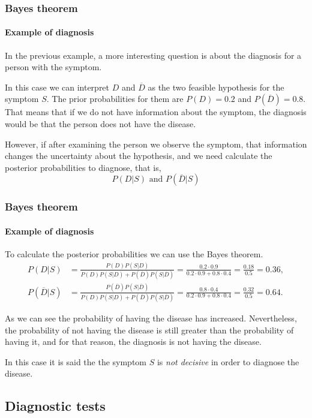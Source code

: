 \begin{frame}
\frametitle{Bayes theorem}
\framesubtitle{Example of diagnosis}
In the previous example, a more interesting question is about the diagnosis for a person with the symptom.  

In this case we can interpret $D$ and $\overline{D}$ as the two feasible hypothesis for the symptom $S$.
The prior probabilities for them are $P(D)=0.2$ and $P(\overline{D})=0.8$.
That means that if we do not have information about the symptom, the diagnosis would be that the person does not have the disease.

However, if after examining the person we observe the symptom, that information changes the uncertainty about the hypothesis, and we need calculate the posterior probabilities to diagnose, that is,
\[
P(D|S) \mbox{ and } P(\overline{D}|S)
\]
\end{frame}


\begin{frame}
\frametitle{Bayes theorem}
\framesubtitle{Example of diagnosis}
To calculate the posterior probabilities we can use the Bayes theorem.
\begin{align*}
P(D|S) &= \frac{P(D)P(S|D)}{P(D)P(S|D)+P(\overline{D})P(S|\overline{D})} = \frac{0.2\cdot 0.9}{0.2\cdot 0.9 + 0.8\cdot 0.4} = \frac{0.18}{0.5}=0.36,\\
P(\overline{D}|S) &= \frac{P(\overline{D})P(S|\overline{D})}{P(D)P(S|D)+P(\overline{D})P(S|\overline{D})} = \frac{0.8\cdot 0.4}{0.2\cdot 0.9 + 0.8\cdot 0.4} = \frac{0.32}{0.5}=0.64.
\end{align*}

As we can see the probability of having the disease has increased. 
Nevertheless, the probability of not having the disease is still greater than the probability of having it, and for that
reason, the diagnosis is not having the disease. 

In this case it is said the the symptom $S$ is \emph{not decisive} in order to diagnose the disease.
\end{frame}


\subsection{Diagnostic tests}

